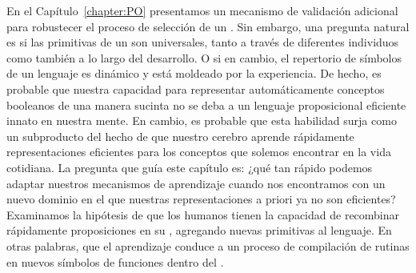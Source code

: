 En el Capítulo~\ref{chapter:PO} presentamos un mecanismo de validación adicional para robustecer el proceso de selección de un \lot. Sin embargo, una pregunta natural es si las primitivas de un \lot son universales, tanto a través de diferentes individuos como también a lo largo del desarrollo. O si en cambio, el repertorio de símbolos de un lenguaje es dinámico y está moldeado por la experiencia. De hecho, es probable que nuestra capacidad para representar automáticamente conceptos booleanos de una manera sucinta no se deba a un lenguaje proposicional eficiente innato en nuestra mente. En cambio, es probable que esta habilidad surja como un subproducto del hecho de que nuestro cerebro aprende rápidamente representaciones eficientes para los conceptos que solemos encontrar en la vida cotidiana. La pregunta que guía este capítulo es: ¿qué tan rápido podemos adaptar nuestros mecanismos de aprendizaje cuando nos encontramos con un nuevo dominio en el que nuestras representaciones a priori ya no son eficientes? Examinamos la hipótesis de que los humanos tienen la capacidad de recombinar rápidamente proposiciones en su \lot, agregando nuevas primitivas al lenguaje. En otras palabras, que el aprendizaje conduce a un proceso de compilación de rutinas en nuevos símbolos de funciones dentro del \lot.



